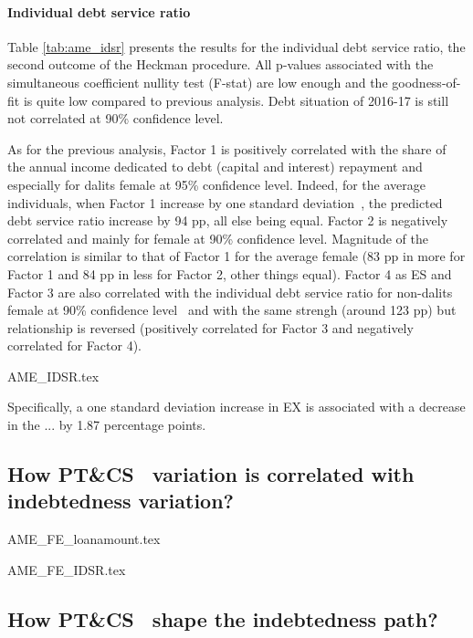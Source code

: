 \documentclass[a4paper, 11pt, onecolumn]{article}
\newcommand{\sd}{standard deviation}
\newcommand{\aebe}{all else being equal}
\newcommand{\ote}{other things equal}
\newcommand{\cl}{confidence level}
\newcommand{\PTCS}{PT\&CS}
\begin{document}
\paragraph{Individual debt service ratio}
Table \ref{tab:ame_idsr} presents the results for the individual debt service ratio, the second outcome of the Heckman procedure.
All p-values associated with the simultaneous coefficient nullity test (F-stat) are low enough and the goodness-of-fit is quite low compared to previous analysis.
Debt situation of 2016-17 is still not correlated at 90\% \cl.

As for the previous analysis, Factor 1 is positively correlated with the share of the annual income dedicated to debt (capital and interest) repayment and especially for dalits female at 95\% \cl.
Indeed, for the average individuals, when Factor 1 increase by one \sd~, the predicted debt service ratio increase by 94 pp, \aebe.
Factor 2 is negatively correlated and mainly for female at 90\% \cl.
Magnitude of the correlation is similar to that of Factor 1 for the average female (83 pp in more for Factor 1 and 84 pp in less for Factor 2, \ote).
Factor 4 as ES and Factor 3 are also correlated with the individual debt service ratio for non-dalits female at 90\% \cl~ and with the same strengh (around 123 pp) but relationship is reversed (positively correlated for Factor 3 and negatively correlated for Factor 4).


{AME_IDSR.tex}

Specifically, a one standard deviation increase in EX is associated with a decrease in the ... by 1.87 percentage points. 




\subsection{How \PTCS~ variation is correlated with indebtedness variation?}

{AME_FE_loanamount.tex}

{AME_FE_IDSR.tex}



\subsection{How \PTCS~ shape the indebtedness path?}
\end{document}
